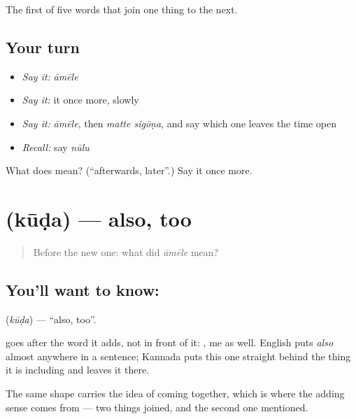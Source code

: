 \begin{grammarlens}[title={What you've built}]
The first of five words that join one thing to the next.
\end{grammarlens}

\subsection*{Your turn}
\begin{itemize}
\raggedright
  \item \emph{Say it:} \emph{āmēle}
  \item \emph{Say it:} it once more, slowly
  \item \emph{Say it:} \emph{āmēle}, then \emph{matte sigōṇa}, and say which one leaves the time open
  \item \emph{Recall:} say \emph{nūlu}
\end{itemize}

\begin{tcolorbox}[breakable,colback=teal!4,colframe=teal!35!black,title={Before you move on}]
What does  mean? (\textquotedblleft{}afterwards, later\textquotedblright{}.) Say it once more.
\end{tcolorbox}
\section[\texorpdfstring{\kn{ಕೂಡ} (kūḍa)}{ಕೂಡ (kūḍa)}]{ (kūḍa) — also, too}

\label{lesson:KA-C64-also}



\begin{quote}
Before the new one: what did \emph{āmēle} mean?
\end{quote}

\subsection*{You'll want to know: }
\textbf{} (\emph{kūḍa}) — \textquotedblleft{}also, too\textquotedblright{}.

 goes after the word it adds, not in front of it:  , me as well. English puts \emph{also} almost anywhere in a sentence; Kannada puts this one straight behind the thing it is including and leaves it there.

The same shape carries the idea of coming together, which is where the adding sense comes from — two things joined, and the second one mentioned.

